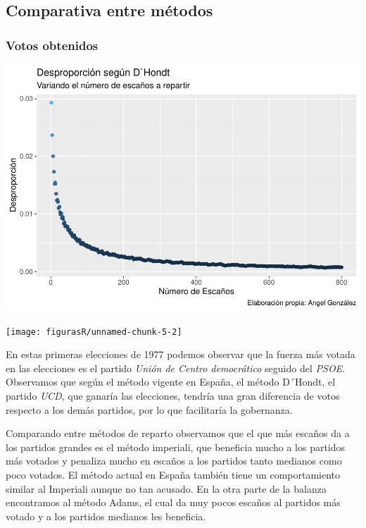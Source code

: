 \documentclass[12pt,a4paper,]{book}
\numberwithin{dummy}{section}
\theoremstyle{ocrenumbox}
\theoremstyle{blacknumex}
\theoremstyle{blacknumbox}
\theoremstyle{ocrenum}
\theoremstyle{ocrenum}
\begin{document}
\hypertarget{comparativa-entre-muxe9todos}{%
\subsection{Comparativa entre
métodos}\label{comparativa-entre-muxe9todos}}

\hypertarget{votos-obtenidos}{%
\subsubsection{Votos obtenidos}\label{votos-obtenidos}}

\begin{center}\includegraphics[width=1\linewidth]{figurasR/unnamed-chunk-5-1} \end{center}

\begin{center}\texttt{[image: figurasR/unnamed-chunk-5-2]} \end{center}

En estas primeras elecciones de 1977 podemos observar que la fuerza más
votada en las elecciones es el partido \emph{Unión de Centro
democrático} seguido del \emph{PSOE}. Observamos que según el método
vigente en España, el método D´Hondt, el partido \emph{UCD}, que ganaría
las elecciones, tendría una gran diferencia de votos respecto a los
demás partidos, por lo que facilitaría la gobernanza.

Comparando entre métodos de reparto observamos que el que más escaños da
a los partidos grandes es el método imperiali, que beneficia mucho a los
partidos más votados y penaliza mucho en escaños a los partidos tanto
medianos como poco votados. El método actual en España también tiene un
comportamiento similar al Imperiali aunque no tan acusado. En la otra
parte de la balanza encontramos al método Adams, el cual da muy pocos
escaños al partidos más votado y a los partidos medianos les beneficia.
\end{document}
